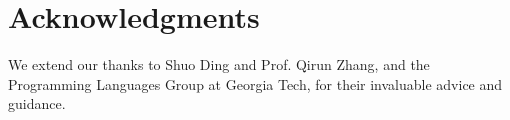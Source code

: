 \documentclass[conference]{IEEEtran}
\begin{document}
\section*{Acknowledgments}

We extend our thanks to Shuo Ding and Prof. Qirun Zhang, and the Programming Languages Group at Georgia Tech, for their invaluable advice and guidance.




\end{document}
